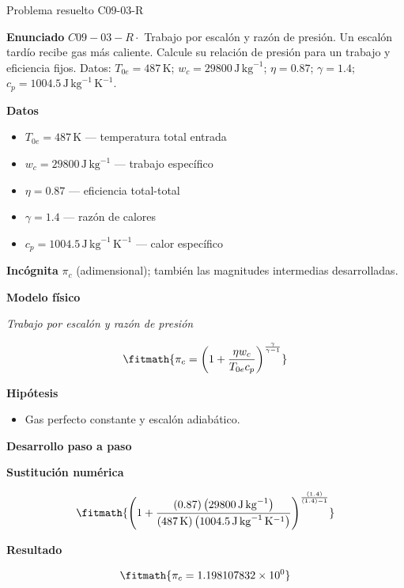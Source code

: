 \documentclass[10pt,openany]{book}
\begin{document}
\begin{studiumworked}{Problema resuelto C09-03-R}


\noindent\textbf{Enunciado}
\(C09-03-R \cdot\) Trabajo por escalón y razón de presión. Un escalón tardío recibe gas más caliente. Calcule su relación de presión para un trabajo y eficiencia fijos. Datos: \(T_{0e}=487\, \mathrm{K}\); \(w_c=29800\, \mathrm{J}\,\mathrm{kg}^{-1}\); \(\eta=0.87\); \(\gamma=1.4\); \(c_p=1004.5\, \mathrm{J}\,\mathrm{kg}^{-1}\,\mathrm{K}^{-1}\).

\noindent\textbf{Datos}
\begin{itemize}
\item $T_{0e} = 487\,\mathrm{K}$ — temperatura total entrada
\item $w_c = 29800\,\mathrm{J}\,\mathrm{kg}^{-1}$ — trabajo específico
\item $\eta = 0.87$ — eficiencia total-total
\item $\gamma = 1.4$ — razón de calores
\item $c_p = 1004.5\,\mathrm{J}\,\mathrm{kg}^{-1}\,\mathrm{K}^{-1}$ — calor específico
\end{itemize}

\noindent\textbf{Incógnita}
$\pi_c$ (adimensional); también las magnitudes intermedias desarrolladas.

\noindent\textbf{Modelo físico}

\noindent\textit{Trabajo por escalón y razón de presión}

\[
\fitmath{\pi_c=\left(1 + \frac{\eta w_c}{T_{0e} c_p}\right)^{\frac{\gamma}{\gamma - 1}}}
\]

\noindent\textbf{Hipótesis}
\begin{itemize}
\item Gas perfecto constante y escalón adiabático.
\end{itemize}

\noindent\textbf{Desarrollo paso a paso}



\noindent\textbf{Sustitución numérica}

\[
\fitmath{\left(1 + \frac{\left(0.87\right) \left(29800\,\mathrm{J}\,\mathrm{kg}^{-1}\right)}{\left(487\,\mathrm{K}\right) \left(1004.5\,\mathrm{J}\,\mathrm{kg}^{-1}\,\mathrm{K}^{-1}\right)}\right)^{\frac{\left(1.4\right)}{\left(1.4\right) - 1}}}
\]

\noindent\textbf{Resultado}

\[
\fitmath{\pi_c=1.198107832\times10^{0}}
\]


\end{studiumworked}
\end{document}
